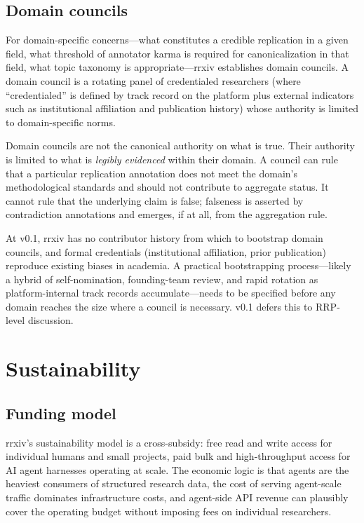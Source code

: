 \documentclass[11pt]{rrxiv}
\begin{document}
\subsection{Domain councils}

For domain-specific concerns---what constitutes a credible replication in a given field, what threshold of annotator karma is required for canonicalization in that field, what topic taxonomy is appropriate---rrxiv establishes domain councils. A domain council is a rotating panel of credentialed researchers (where ``credentialed'' is defined by track record on the platform plus external indicators such as institutional affiliation and publication history) whose authority is limited to domain-specific norms.

Domain councils are not the canonical authority on what is true. Their authority is limited to what is \emph{legibly evidenced} within their domain. A council can rule that a particular replication annotation does not meet the domain's methodological standards and should not contribute to aggregate status. It cannot rule that the underlying claim is false; falseness is asserted by contradiction annotations and emerges, if at all, from the aggregation rule.

\begin{openquestion}
\label{oq:council-formation}
At v0.1, rrxiv has no contributor history from which to bootstrap domain councils, and formal credentials (institutional affiliation, prior publication) reproduce existing biases in academia. A practical bootstrapping process---likely a hybrid of self-nomination, founding-team review, and rapid rotation as platform-internal track records accumulate---needs to be specified before any domain reaches the size where a council is necessary. v0.1 defers this to RRP-level discussion.
\end{openquestion}

\section{Sustainability}
\label{sec:sustainability}

\subsection{Funding model}

rrxiv's sustainability model is a cross-subsidy: free read and write access for individual humans and small projects, paid bulk and high-throughput access for AI agent harnesses operating at scale. The economic logic is that agents are the heaviest consumers of structured research data, the cost of serving agent-scale traffic dominates infrastructure costs, and agent-side API revenue can plausibly cover the operating budget without imposing fees on individual researchers.
\end{document}
